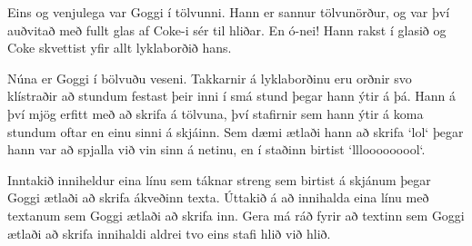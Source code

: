 

Eins og venjulega var Goggi í tölvunni. Hann er sannur tölvunörður, og var því
auðvitað með fullt glas af Coke-i sér til hliðar. En ó-nei! Hann rakst í glasið
og Coke skvettist yfir allt lyklaborðið hans.

Núna er Goggi í bölvuðu veseni. Takkarnir á lyklaborðinu eru orðnir svo
klístraðir að stundum festast þeir inni í smá stund þegar hann ýtir á þá. Hann
á því mjög erfitt með að skrifa á tölvuna, því stafirnir sem hann ýtir á koma
stundum oftar en einu sinni á skjáinn. Sem dæmi ætlaði hann að skrifa `lol`
þegar hann var að spjalla við vin sinn á netinu, en í staðinn birtist
`lllooooooool`.

Inntakið inniheldur eina línu sem táknar streng sem birtist á skjánum þegar
Goggi ætlaði að skrifa ákveðinn texta. Úttakið á að innihalda eina línu með
textanum sem Goggi ætlaði að skrifa inn. Gera má ráð fyrir að textinn sem Goggi
ætlaði að skrifa innihaldi aldrei tvo eins stafi hlið við hlið.
